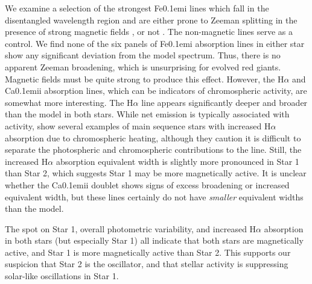 We examine a selection of the strongest {\rm Fe}\kern 0.1em{\sc i} lines which fall in the disentangled wavelength region and are either prone to Zeeman splitting in the presence of strong magnetic fields \citep{har73}, or not \citep{sis70}. The non-magnetic lines serve as a control. We find none of the six panels of {\rm Fe}\kern 0.1em{\sc i} absorption lines in either star show any significant deviation from the model spectrum. Thus, there is no apparent Zeeman broadening, which is unsurprising for evolved red giants. Magnetic fields must be quite strong to produce this effect. However, the H$\alpha$ and {\rm Ca}\kern 0.1em{\sc ii} absorption lines, which can be indicators of chromospheric activity, are somewhat more interesting. The H$\alpha$ line appears significantly deeper and broader than the model in both stars. While net emission is typically associated with activity, \citet{rob90} show several examples of main sequence stars with increased H$\alpha$ absorption due to chromospheric heating, although they caution it is difficult to separate the photospheric and chromospheric contributions to the line. Still, the increased H$\alpha$ absorption equivalent width is slightly more pronounced in Star 1 than Star 2, which suggests Star 1 may be more magnetically active. It is unclear whether the {\rm Ca}\kern 0.1em{\sc ii} doublet shows signs of excess broadening or increased equivalent width, but these lines certainly do not have \emph{smaller} equivalent widths than the model.

The spot on Star 1, overall photometric variability, and increased H$\alpha$ absorption in both stars (but especially Star 1) all indicate that both stars are magnetically active, and Star 1 is more magnetically active than Star 2. This supports our suspicion that Star 2 is the oscillator, and that stellar activity is suppressing solar-like oscillations in Star 1.
  
  